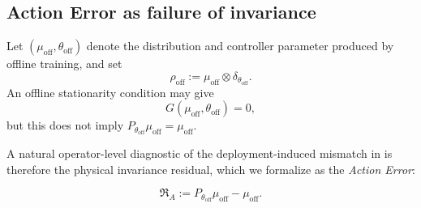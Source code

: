 \documentclass[11pt]{article}
\theoremstyle{definition}
\theoremstyle{remark}
\begin{document}
\subsection{Action Error as failure of invariance}
\label{sec:action-error}

Let \((\mu_{\mathrm{off}},\theta_{\mathrm{off}})\) denote the distribution and
controller parameter produced by offline training, and set
\[
  \rho_{\mathrm{off}}
  :=\mu_{\mathrm{off}}\otimes\delta_{\theta_{\mathrm{off}}}.
\]
An offline stationarity condition may give
\begin{equation}
  G(\mu_{\mathrm{off}},\theta_{\mathrm{off}})=0,
  \label{eq:offline-learning-stationarity}
\end{equation}
but this does not imply
\(P_{\theta_{\mathrm{off}}}\mu_{\mathrm{off}}=\mu_{\mathrm{off}}\).

A natural operator-level diagnostic of the deployment-induced mismatch in
\cite{LippiActionError} is therefore the physical invariance residual, which we formalize as the \emph{Action Error}:

\begin{equation}
  \mathfrak R_A
  :=P_{\theta_{\mathrm{off}}}\mu_{\mathrm{off}}
    -\mu_{\mathrm{off}}.
  \label{eq:action-residual}
\end{equation}
\end{document}
